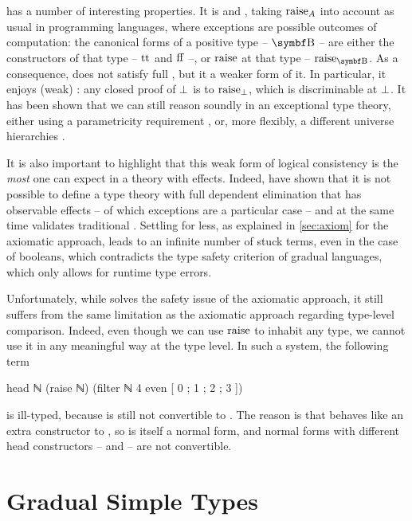  has a number of interesting properties. It is
 and , taking $\rai[A]$
into account as usual in programming languages,
where exceptions are possible outcomes of computation: the canonical forms
of a positive type – \eg $\Bool$ – are either the
constructors of that type – \eg $\operatorname{tt}$ and $\operatorname{ff}$ –, or
$\rai$ at that type – \eg $\rai[\Bool]$.
%
As a consequence,  does not satisfy full , but it
a weaker form of it. In particular, it enjoys
(weak) : any closed proof of $\operatorname{\bot}$ is 
to $\rai[\Empty]$, which is discriminable at $\operatorname{\bot}$.
%
It has been shown that we can still reason soundly in an
exceptional type theory, either using a parametricity
requirement , or, more flexibly, a
different universe hierarchies .

It is also important to highlight that this weak form of logical
consistency is the \emph{most} one can expect in
a theory with effects. Indeed,  have
shown that it is not possible to define a type theory with full
dependent elimination%
that has observable effects – of which
exceptions are a particular case – and at the same time validates
traditional .
%
Settling for less, as explained in \cref{sec:axiom} for the axiomatic
approach, leads to an infinite number of stuck terms, even in the
case of booleans, which contradicts the type safety criterion of gradual languages,
which only allows for runtime type errors.

Unfortunately, while  solves the safety issue of the axiomatic approach, it still suffers from the same limitation as the axiomatic approach regarding type-level comparison.
Indeed, even though we can use $\rai$ to inhabit any type,
we cannot use it in any meaningful way at the type level.
In such a system, the following term
\begin{coqcode}
  head ℕ (raise ℕ) (filter ℕ 4 even [ 0 ; 1 ; 2 ; 3 ])
\end{coqcode}
is ill-typed, because  is still not convertible to
.
The reason is that  behaves like an extra constructor to , so
 is itself a normal form,
and normal forms with different head constructors
–  and  – are not convertible.

\section{Gradual Simple Types}
\label{sec:grad-simple}

